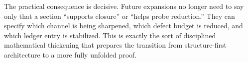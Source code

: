 The practical consequence is decisive. Future expansions no longer need to say only
that a section ``supports closure'' or ``helps probe reduction.'' They can specify
which channel is being sharpened, which defect budget is reduced, and which ledger
entry is stabilized. This is exactly the sort of disciplined mathematical
thickening that prepares the transition from structure-first architecture to a more
fully unfolded proof.


